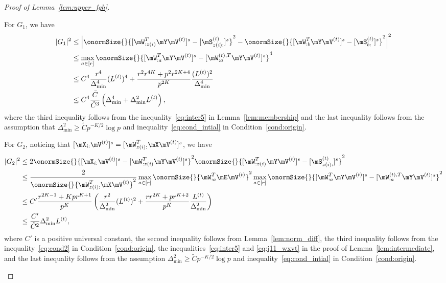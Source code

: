 \documentclass[lettersize,onecolumn,journal]{IEEEtran}
\theoremstyle{definition}
\theoremstyle{definition}
\newcommand{\of}[1]{\left(#1\right)}
\newcommand{\aabs}[1]{\left|#1\right|}
\begin{document}
\begin{proof}[Proof of Lemma~\ref{lem:upper_fgh}]
\begin{enumerate}[wide]
    For $G_1$, we have 
    \begin{align}
        |G_1|^2 &\leq \aabs{ \onormSize{}{ [ \mW_{:z(i)}^T \mY \mV^{(t)} ]^s - [ \mS_{z(i):}^{(t)}  ]^s}^2 - \onormSize{}{ [ \mW_{:b}^T \mY \mV^{(t)} ]^s -  [ \mS_{b:}^{(t)}  ]^s }^2 }^2 \\
        & \leq \max_{a \in [r]} \onormSize{}{ [ \mW_{:a}^T \mY \mV^{(t)} ]^s - [ \mW_{:a}^{(t),T} \mY \mV^{(t)}  ]^s}^4\\
        & \leq C^4 \frac{r^4}{\Delta_{\min}^4} (L^{(t)})^4 +  \frac{r^2 r^{4K} + p^2r^{2K+4}}{p^{2K}} \frac{(L^{(t)})^2}{\Delta_{\min}^4} \\
        & \leq C^4 \frac{\bar C}{\tilde C^3} \of{\Delta_{\min}^4 +  \Delta_{\min}^2 L^{(t)}}, \label{eq:g1}
    \end{align}
    where the third inequality follows from the inequality~\eqref{eq:inter5} in Lemma~\ref{lem:membership} and the last inequality follows from the assumption that $\Delta_{\min}^2 \geq \tilde C p^{-K/2}\log p$ and inequality~\eqref{eq:cond_intial} in Condition~\ref{cond:origin}.
    
    For $G_2$, noticing that $[\mX_{i:} \mV^{(t)}]^s = [ \mW_{z(i):}^T\mX \mV^{(t)}]^s$, we have 
    \begin{align}
        |G_2|^2 &\leq 2\onormSize{}{ [\mX_{i:} \mV^{(t)}]^s  -  [  \mW_{:z(i)}^T \mY \mV^{(t)} ]^s}^2 \onormSize{}{ [  \mW_{:z(i)}^T \mY \mV^{(t)} ]^s -  [  \mS_{z(i):}^{(t)}  ]^s }^2 \\
        & \leq \frac{2}{ \onormSize{}{ \mW_{z(i):}^T\mX \mV^{(t)}}^2} \max_{a \in [r]}\onormSize{}{ \mW_{:a}^T \mE \mV^{(t)} }^2 \max_{a \in [r]} \onormSize{}{ [  \mW_{:a}^T \mY \mV^{(t)} ]^s -  [   \mW_{:a}^{(t),T} \mY \mV^{(t)}  ]^s}^2\\
        & \leq C' \frac{ r^{2K-1} + K p r^{K+1} }{p^{K}} \of{ \frac{r^2}{\Delta_{\min}^2} (L^{(t)})^2 + \frac{r r^{2K} + pr^{K+2}}{p^{K}} \frac{L^{(t)}}{\Delta_{\min}^2} }\\
        & \leq \frac{C'}{\tilde C^2} \Delta_{\min}^2 L^{(t)},\label{eq:g2}
    \end{align}
    where $C'$ is a positive universal constant, the second inequality follows from Lemma~\ref{lem:norm_diff}, the third inequality follows from the inequality~\eqref{eq:cond2} in Condition~\ref{cond:origin}, the inequalities~\eqref{eq:inter5} and \eqref{eq:j11_wxvt} in the proof of Lemma~\ref{lem:intermediate},  and the last inequality follows from the assumption $\Delta_{\min}^2 \geq \tilde C p^{-K/2} \log p$ and inequality~\eqref{eq:cond_intial} in Condition~\ref{cond:origin}.
    

\end{enumerate}
\end{proof}
\end{document}
